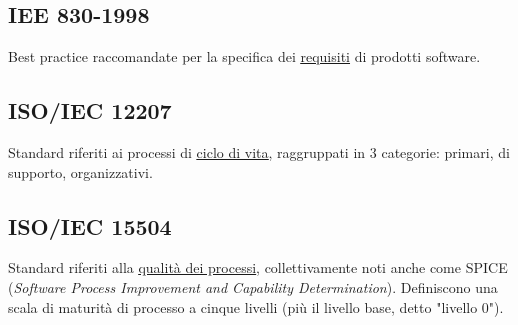 	\subsection{IEE 830-1998}
	\label{sec:iee830}
	Best practice raccomandate per la specifica dei \underline{\hyperref[sec:requisito]{requisiti}} di prodotti software. 
	

	\subsection{ISO/IEC 12207}
	\label{sec:iso12207}
	Standard riferiti ai processi di \underline{\hyperref[sec:ciclodivita]{ciclo di vita}}, raggruppati in 3 categorie: primari, di supporto, organizzativi.
	
	\subsection{ISO/IEC 15504}
	\label{sec:iso15504}
	Standard riferiti alla \underline{\hyperref[sec:qualitaprocessi]{qualità dei processi}}, collettivamente noti anche come SPICE (\emph{Software Process Improvement and Capability Determination}). Definiscono una scala di maturità di processo a cinque livelli (più il livello base, detto "livello 0").
	
